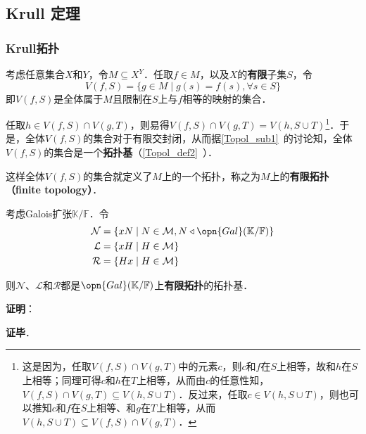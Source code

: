 \subsection{Krull 定理}\label{GExInf_sub1}


\subsubsection{Krull拓扑}

考虑任意集合$X$和$Y$，令$M\subseteq X^Y$．任取$f\in M$，以及$X$的\textbf{有限}子集$S$，令
\begin{equation}
V(f, S) = \{g\in M\mid g(s)=f(s), \forall s\in S\}
\end{equation}
即$V(f, S)$是全体属于$M$且限制在$S$上与$f$相等的映射的集合．

任取$h\in V(f, S)\cap V(g, T)$，则易得$V(f, S)\cap V(g, T) = V(h, S\cup T)$\footnote{这是因为，任取$V(f, S)\cap V(g, T)$中的元素$c$，则$c$和$f$在$S$上相等，故和$h$在$S$上相等；同理可得$c$和$h$在$T$上相等，从而由$c$的任意性知，$V(f, S)\cap V(g, T)\subseteq V(h, S\cup T)$．反过来，任取$c\in V(h, S\cup T)$，则也可以推知$c$和$f$在$S$上相等、和$g$在$T$上相等，从而$V(h, S\cup T)\subseteq V(f, S)\cap V(g, T)$．}．于是，全体$V(f, S)$的集合对于有限交封闭，从而据\autoref{Topol_sub1}~的讨论知，全体$V(f, S)$的集合是一个\textbf{拓扑基}（\autoref{Topol_def2}~）．

这样全体$V(f, S)$的集合就定义了$M$上的一个拓扑，称之为$M$上的\textbf{有限拓扑（finite topology）}．



\begin{theorem}{}
考虑Galois扩张$\mathbb{K}/\mathbb{F}$．令
\begin{equation}
\begin{aligned}
\mathcal{N} &= \{xN\mid N\in\mathcal{M}, N\triangleleft\opn{Gal}(\mathbb{K}/\mathbb{F})\}\\
\mathcal{L} &= \{xH\mid H\in\mathcal{M}\}\\
\mathcal{R} &= \{Hx\mid H\in\mathcal{M}\}
\end{aligned}
\end{equation}

则$\mathcal{N}$、$\mathcal{L}$和$\mathcal{R}$都是$\opn{Gal}(\mathbb{K}/\mathbb{F})$上\textbf{有限拓扑}的拓扑基．
\end{theorem}

\textbf{证明}：



\textbf{证毕}．



































